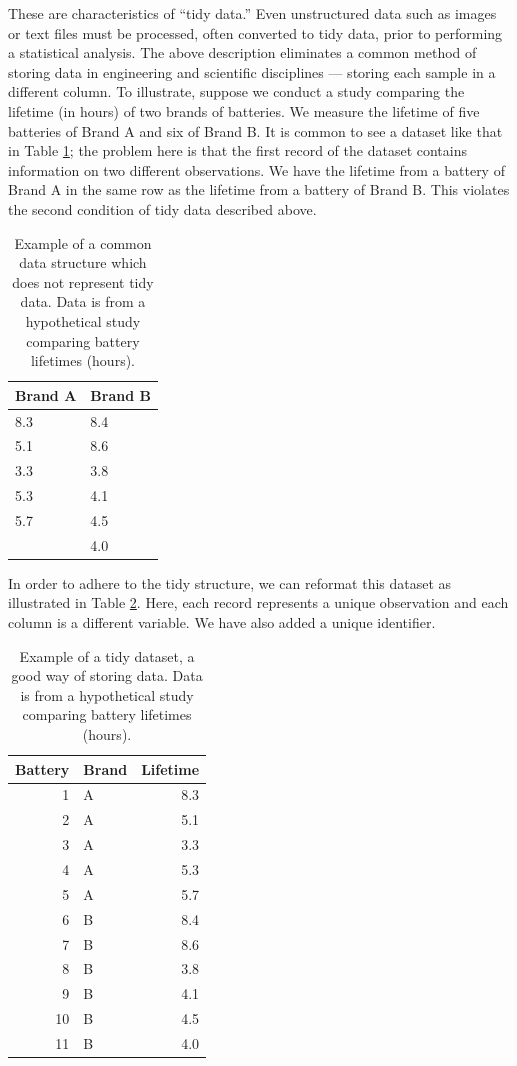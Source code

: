 \documentclass[
]{book}
\theoremstyle{plain}
\theoremstyle{mydefn}
\theoremstyle{myexmpl}
\theoremstyle{remark}
\begin{document}
These are characteristics of ``tidy data.'' Even unstructured data such as images or text files must be processed, often converted to tidy data, prior to performing a statistical analysis. The above description eliminates a common method of storing data in engineering and scientific disciplines --- storing each sample in a different column. To illustrate, suppose we conduct a study comparing the lifetime (in hours) of two brands of batteries. We measure the lifetime of five batteries of Brand A and six of Brand B. It is common to see a dataset like that in Table \ref{tab:basics-poor-dataset}; the problem here is that the first record of the dataset contains information on two different observations. We have the lifetime from a battery of Brand A in the same row as the lifetime from a battery of Brand B. This violates the second condition of tidy data described above.

\begin{table}

\caption{\label{tab:basics-poor-dataset}Example of a common data structure which does not represent tidy data.  Data is from a hypothetical study comparing battery lifetimes (hours).}
\centering
\begin{tabular}[t]{l|l}
\hline
Brand A & Brand B\\
\hline
8.3 & 8.4\\
\hline
5.1 & 8.6\\
\hline
3.3 & 3.8\\
\hline
5.3 & 4.1\\
\hline
5.7 & 4.5\\
\hline
 & 4.0\\
\hline
\end{tabular}
\end{table}

In order to adhere to the tidy structure, we can reformat this dataset as illustrated in Table \ref{tab:basics-good-dataset}. Here, each record represents a unique observation and each column is a different variable. We have also added a unique identifier.

\begin{table}

\caption{\label{tab:basics-good-dataset}Example of a tidy dataset, a good way of storing data.  Data is from a hypothetical study comparing battery lifetimes (hours).}
\centering
\begin{tabular}[t]{r|l|r}
\hline
Battery & Brand & Lifetime\\
\hline
1 & A & 8.3\\
\hline
2 & A & 5.1\\
\hline
3 & A & 3.3\\
\hline
4 & A & 5.3\\
\hline
5 & A & 5.7\\
\hline
6 & B & 8.4\\
\hline
7 & B & 8.6\\
\hline
8 & B & 3.8\\
\hline
9 & B & 4.1\\
\hline
10 & B & 4.5\\
\hline
11 & B & 4.0\\
\hline
\end{tabular}
\end{table}
\end{document}
